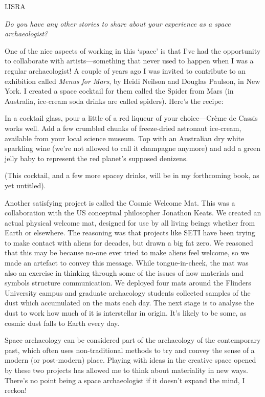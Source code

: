 \begin{labeling}{IJSRA}
	\item[IJSRA] \emph{Do you have any other stories to share about your experience as a space archaeologist?}

	\item[AG] One of the nice aspects of working in this ‘space’ is that I’ve had the opportunity to collaborate with artists—something that never used to happen when I was a regular archaeologist! A couple of years ago I was invited to contribute to an exhibition called \emph{Menus for Mars}, by Heidi Neilson and Douglas Paulson, in New York. I created a space cocktail for them called the Spider from Mars (in Australia, ice-cream soda drinks are called spiders). Here’s the recipe:

	In a cocktail glass, pour a little of a red liqueur of your choice—Crème de Cassis works well. Add a few crumbled chunks of freeze-dried astronaut ice-cream, available from your local science museum. Top with an Australian dry white sparkling wine (we’re not allowed to call it champagne anymore) and add a green jelly baby to represent the red planet’s supposed denizens.

	(This cocktail, and a few more spacey drinks, will be in my forthcoming book, as yet untitled).

	Another satisfying project is called the Cosmic Welcome Mat. This was a collaboration with the US conceptual philosopher Jonathon Keats. We created an actual physical welcome mat, designed for use by all living beings whether from Earth or elsewhere. The reasoning was that projects like SETI have been trying to make contact with aliens for decades, but drawn a big fat zero. We reasoned that this may be because no-one ever tried to make aliens feel welcome, so we made an artefact to convey this message. While tongue-in-cheek, the mat was also an exercise in thinking through some of the issues of how materials and symbols structure communication. We deployed four mats around the Flinders University campus and graduate archaeology students collected samples of the dust which accumulated on the mats each day. The next stage is to analyse the dust to work how much of it is interstellar in origin. It’s likely to be some, as cosmic dust falls to Earth every day.

	Space archaeology can be considered part of the archaeology of the contemporary past, which often uses non-traditional methods to try and convey the sense of a modern (or post-modern) place. Playing with ideas in the creative space opened by these two projects has allowed me to think about materiality in new ways. There’s no point being a space archaeologist if it doesn’t expand the mind, I reckon!


\end{labeling}
